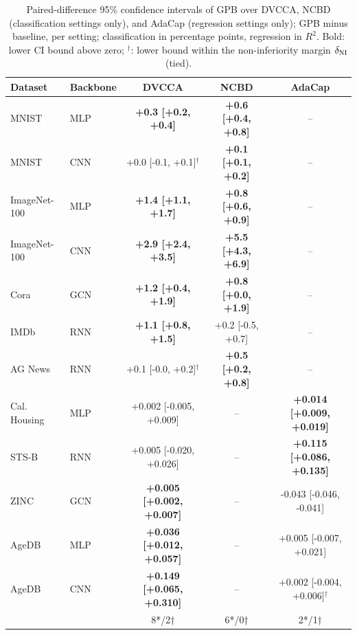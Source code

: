 \par\smallskip
\begin{table}[t]
\centering
\caption{Paired-difference 95\% confidence intervals of GPB over DVCCA, NCBD (classification settings only), and AdaCap (regression settings only); GPB minus baseline, per setting; classification in percentage points, regression in $R^2$. Bold: lower CI bound above zero; $^{\dagger}$: lower bound within the non-inferiority margin $\delta_{\rm NI}$ (tied).}
\label{tab:main_result_ci_external}
\small
{
\setlength{\tabcolsep}{0.5pt}
\begin{tabular}{llccc}
\hline
Dataset & Backbone & DVCCA & NCBD & AdaCap \\
\hline
MNIST & MLP & \textbf{+0.3 [+0.2, +0.4]} & \textbf{+0.6 [+0.4, +0.8]} & -- \\
MNIST & CNN & +0.0 [-0.1, +0.1]$^{\dagger}$ & \textbf{+0.1 [+0.1, +0.2]} & -- \\
ImageNet-100 & MLP & \textbf{+1.4 [+1.1, +1.7]} & \textbf{+0.8 [+0.6, +0.9]} & -- \\
ImageNet-100 & CNN & \textbf{+2.9 [+2.4, +3.5]} & \textbf{+5.5 [+4.3, +6.9]} & -- \\
Cora & GCN & \textbf{+1.2 [+0.4, +1.9]} & \textbf{+0.8 [+0.0, +1.9]} & -- \\
IMDb & RNN & \textbf{+1.1 [+0.8, +1.5]} & +0.2 [-0.5, +0.7] & -- \\
AG News & RNN & +0.1 [-0.0, +0.2]$^{\dagger}$ & \textbf{+0.5 [+0.2, +0.8]} & -- \\
\hline\hline
Cal. Housing & MLP & +0.002 [-0.005, +0.009] & -- & \textbf{+0.014 [+0.009, +0.019]} \\
STS-B & RNN & +0.005 [-0.020, +0.026] & -- & \textbf{+0.115 [+0.086, +0.135]} \\
ZINC & GCN & \textbf{+0.005 [+0.002, +0.007]} & -- & -0.043 [-0.046, -0.041] \\
AgeDB & MLP & \textbf{+0.036 [+0.012, +0.057]} & -- & +0.005 [-0.007, +0.021] \\
AgeDB & CNN & \textbf{+0.149 [+0.065, +0.310]} & -- & +0.002 [-0.004, +0.006]$^{\dagger}$ \\
\hline
 &  & 8*/2† & 6*/0† & 2*/1† \\
\hline
\end{tabular}
}
\end{table}
\par\smallskip
